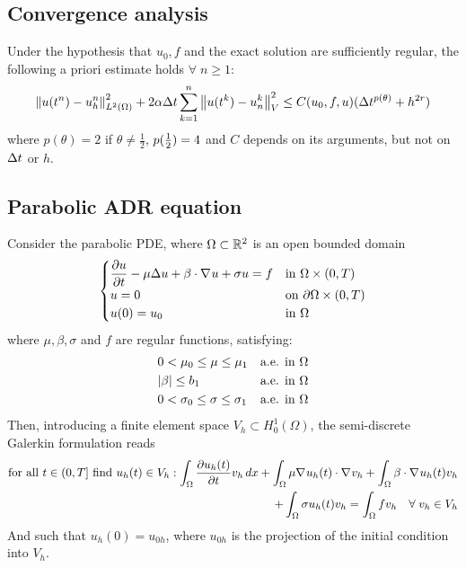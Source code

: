\subsection{Convergence analysis}
\begin{theorem}
    Under the hypothesis that \(u_0, f\) and the exact solution are sufficiently regular, the following a priori estimate holds \(\forall \; n \geq 1\): 
    \[
        \norm{u(t^n) - u_h^n}_{L^2(\Omega)}^2 + 2\alpha \Delta t \sum_{k=1}^{n}\norm{u(t^k) - u^k_n}_V^2 \leq C(u_0, f, u) (\Delta t^{p(\theta)} + h^{2r})
    \]
    where \(p(\theta) = 2\) if \(\theta \neq \frac{1}{2}\), \(p(\frac{1}{2}) = 4\) and \(C\) depends on its arguments, but not on \(\Delta t\) or \(h\).
\end{theorem}
\subsection{Parabolic ADR equation}
Consider the parabolic PDE, where \(\Omega \subset \mathbb{R}^2\) is an open bounded domain
\begin{equation}
    \begin{cases}
       \displaystyle \partialderivative{u}{t} - \mu \Delta u + \beta \cdot \grad u + \sigma u = f & \txt{in }\Omega \times (0,T) \\
       u = 0 & \txt{on }\boundary \times (0,T) \\
       u(0) = u_0 & \txt{in } \Omega
   \end{cases}
   \label{parabolic_adr_pbl}
\end{equation}
where \(\mu , \beta, \sigma\) and \(f\) are regular functions, satisfying: 
\begin{align*}
    & 0 < \mu_0 \leq \mu \leq \mu_1 & \text{a.e. in } \Omega \\
    &\abs{\beta} \leq b_1 & \text{a.e. in } \Omega \\
    &0 < \sigma_0 \leq \sigma \leq \sigma_1 & \text{a.e. in } \Omega
\end{align*}
Then, introducing a finite element space \(V_h \subset H^1_0(\Omega)\), the semi-discrete Galerkin formulation reads 
\begin{equation}
    \begin{split}
        \txt{for all } t \in (0, T] \txt{ find }u_h(t) \in V_h : \int_\Omega \partialderivative{u_h(t)}{t} v_h \, dx + \int_\Omega \mu \grad u_h (t) \cdot \grad v_h + \int_\Omega \beta \cdot \grad u_h(t) v_h \\
        + \int_\Omega \sigma u_h(t) v_h = \int_\Omega f v_h \quad \forall \; v_h \in V_h 
    \end{split}
    \label{semi_weak_form_parabolic_adr_pbl}
\end{equation}
And such that \(u_h(0) = u_{0h}\), where \(u_{0h}\) is the projection of the initial condition into \(V_h\).
